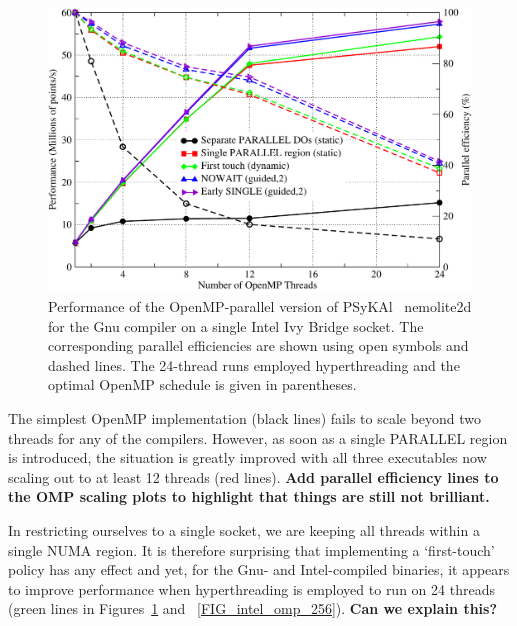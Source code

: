 \documentclass[journal]{IEEEtran}
\newlength{\picwidth}
\newcommand{\psykal}{{PS}y{KA}l\ }
\begin{document}
\begin{figure}
\centering
\includegraphics[width=\picwidth]{omp_scaling_256_gnu}
\caption{Performance of the OpenMP-parallel version of \psykal
  nemolite2d for the Gnu compiler on a single Intel Ivy Bridge
  socket. The corresponding parallel efficiencies are shown using open
  symbols and dashed lines. The 24-thread runs employed hyperthreading
  and the optimal OpenMP schedule is given in parentheses.}
\label{FIG_gnu_omp_256}
\end{figure}

The simplest OpenMP implementation (black lines) fails to scale beyond
two threads for any of the compilers. However, as soon as a single
PARALLEL region is introduced, the situation is greatly improved with
all three executables now scaling out to at least 12 threads (red
lines). {\bf Add parallel efficiency lines to the OMP scaling plots to
  highlight that things are still not brilliant.}

In restricting ourselves to a single socket, we are keeping all
threads within a single NUMA region. It is therefore surprising that
implementing a `first-touch' policy has any effect and yet, for the
Gnu- and Intel-compiled binaries, it appears to improve performance
when hyperthreading is employed to run on 24 threads (green lines in
Figures~\ref{FIG_gnu_omp_256} and ~\ref{FIG_intel_omp_256}). {\bf Can
  we explain this?}
\end{document}
